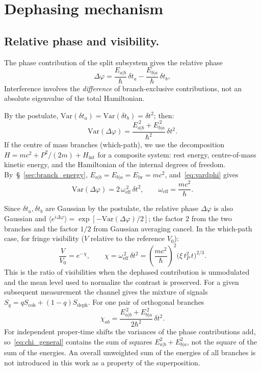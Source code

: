 \documentclass[11pt,a4paper]{article}
\begin{document}
\section{Dephasing mechanism}\label{sec:decoherence}

\subsection{Relative phase and visibility.}
The phase contribution of the split subsystem gives the relative phase
\begin{equation}
\Delta\varphi=\frac{E_{a|b}}{\hbar}\,\delta t_a-\frac{E_{b|a}}{\hbar}\,\delta t_b,
\label{eq:dphi}
\end{equation}
Interference involves the \emph{difference} of branch-exclusive contributions, not an absolute eigenvalue of the total Hamiltonian.

By the postulate, $\mathrm{Var}(\delta t_a)=\mathrm{Var}(\delta t_b)=\delta t^2$; then:
\begin{equation}
\mathrm{Var}(\Delta\varphi)=\frac{E_{a|b}^{\,2}+E_{b|a}^{\,2}}{\hbar^2}\,\delta t^2.
\label{eq:vardphi}
\end{equation}
If the centre of mass branches (which-path), we use the decomposition $H = mc^2 + P^2/(2m) + H_{\mathrm{int}}$ for a composite system: rest energy, centre-of-mass kinetic energy, and the Hamiltonian of the internal degrees of freedom. By~\S~\ref{sec:branch_energy}, $E_{a|b}=E_{b|a}=E_{\mathrm{br}}=mc^2$, and~\eqref{eq:vardphi} gives
\begin{equation}
\mathrm{Var}(\Delta\varphi)=2\,\omega_{\mathrm{eff}}^{\,2}\,\delta t^2,
\qquad \omega_{\mathrm{eff}}=\frac{mc^2}{\hbar}.
\end{equation}

Since $\delta t_a,\delta t_b$ are Gaussian by the postulate, the relative phase $\Delta\varphi$ is also Gaussian and $\langle e^{i\Delta\varphi}\rangle=\exp[-\mathrm{Var}(\Delta\varphi)/2]$; the factor $2$ from the two branches and the factor $1/2$ from Gaussian averaging cancel. In the which-path case, for fringe visibility ($V$ relative to the reference $V_0$):
\begin{equation}
\boxed{\;\frac{V}{V_0}=e^{-\chi},
\qquad
\chi=\omega_{\mathrm{eff}}^{\,2}\,\delta t^2
=\left(\frac{mc^2}{\hbar}\right)^{2}\!\bigl(\xi\,t_P^2\,t\bigr)^{2/3}.\;}
\label{eq:chi}
\end{equation}
This is the ratio of visibilities when the dephased contribution is unmodulated and the mean level used to normalize the contrast is preserved. For a given subsequent measurement the channel gives the mixture of signals $S_q=qS_{\mathrm{coh}}+(1-q)S_{\mathrm{deph}}$.
For one pair of orthogonal branches
\begin{equation}
\boxed{\;
\chi_{ab}=\frac{E_{a|b}^{\,2}+E_{b|a}^{\,2}}{2\hbar^2}\,\delta t^2.
\;}
\label{eq:chi_general}
\end{equation}
For independent proper-time shifts the variances of the phase contributions add, so~\eqref{eq:chi_general} contains the sum of squares $E_{a|b}^2+E_{b|a}^2$, not the square of the sum of the energies. An overall unweighted sum of the energies of all branches is not introduced in this work as a property of the superposition.
\end{document}
